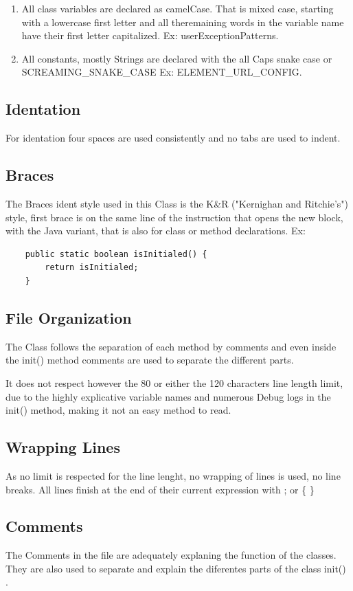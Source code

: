 \documentclass[a4paper]{article}
\begin{document}
\begin{enumerate}
\item All class variables are declared as camelCase. That is mixed case, starting with a lowercase first letter and all theremaining words in the variable name have their first letter capitalized. Ex: \ttfamily userExceptionPatterns\rmfamily.

\item All constants, mostly Strings are declared with the all Caps snake case or \ttfamily SCREAMING\_SNAKE\_CASE \rmfamily Ex: \ttfamily ELEMENT\_URL\_CONFIG\rmfamily.
\end{enumerate}
\subsection{Identation}
For identation four spaces are used consistently and no tabs are used to indent.

\subsection{Braces}
The Braces ident style used in this Class is the  K\&R ("Kernighan and Ritchie's") style, first brace is on the same line of the instruction that opens the new block, with the Java variant, that is also for class or method declarations. Ex:
\begin{verbatim}   
    public static boolean isInitialed() {
        return isInitialed;
    }
\end{verbatim}
\newpage

\subsection{File Organization}
The Class follows the separation of each method by comments and even inside the \ttfamily init() \rmfamily method comments are used to separate the different parts.\par 
It does not respect however the 80 or either the 120 characters line length limit, due to the highly explicative variable names and numerous Debug logs in the \ttfamily init() \rmfamily method, making it not an easy method to read. 
\subsection{Wrapping Lines}
As no limit is respected for the line lenght, no wrapping of lines is used, no line breaks. All lines finish at the end of their current expression with \ttfamily ; \rmfamily or \ttfamily \{ \} \rmfamily 
\subsection{Comments}
The Comments in the file are adequately explaning the function of the classes. They are also used to separate and explain the diferentes parts of the class \ttfamily init() \rmfamily.
\end{document}
